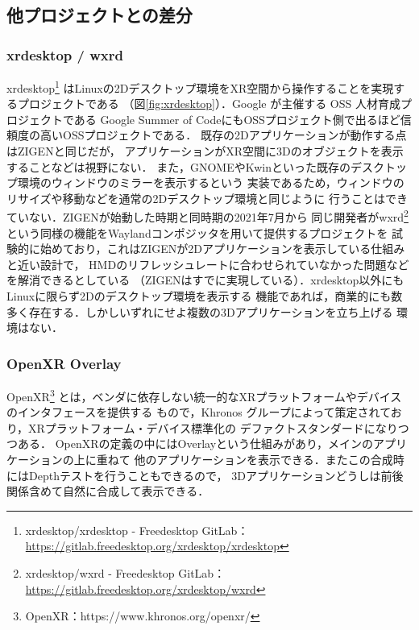 \subsection{他プロジェクトとの差分}
\label{section:project-uniqueness}

\subsubsection{xrdesktop / wxrd}

xrdesktop\footnote{xrdesktop/xrdesktop - Freedesktop GitLab：\url{https://gitlab.freedesktop.org/xrdesktop/xrdesktop}}
はLinuxの2Dデスクトップ環境をXR空間から操作することを実現するプロジェクトである
（図\ref{fig:xrdesktop}）．Google が主催する OSS 人材育成プロジェクトである
Google Summer of CodeにもOSSプロジェクト側で出るほど信頼度の高いOSSプロジェクトである．
既存の2Dアプリケーションが動作する点はZIGENと同じだが，
アプリケーションがXR空間に3Dのオブジェクトを表示することなどは視野にない．
また，GNOMEやKwinといった既存のデスクトップ環境のウィンドウのミラーを表示するという
実装であるため，ウィンドウのリサイズや移動などを通常の2Dデスクトップ環境と同じように
行うことはできていない．ZIGENが始動した時期と同時期の2021年7月から
同じ開発者がwxrd\footnote{xrdesktop/wxrd - Freedesktop GitLab：\url{https://gitlab.freedesktop.org/xrdesktop/wxrd}}
という同様の機能をWaylandコンポジッタを用いて提供するプロジェクトを
試験的に始めており，これはZIGENが2Dアプリケーションを表示している仕組みと近い設計で，
HMDのリフレッシュレートに合わせられていなかった問題などを解消できるとしている
（ZIGENはすでに実現している）．xrdesktop以外にもLinuxに限らず2Dのデスクトップ環境を表示する
機能であれば，商業的にも数多く存在する．しかしいずれにせよ複数の3Dアプリケーションを立ち上げる
環境はない．

\subsubsection{OpenXR Overlay}
\label{section:openxr-overlay}

OpenXR\footnote{OpenXR：https://www.khronos.org/openxr/}
とは，ベンダに依存しない統一的なXRプラットフォームやデバイスのインタフェースを提供する
もので，Khronos グループによって策定されており，XRプラットフォーム・デバイス標準化の
デファクトスタンダードになりつつある．
OpenXRの定義の中にはOverlayという仕組みがあり，メインのアプリケーションの上に重ねて
他のアプリケーションを表示できる．またこの合成時にはDepthテストを行うこともできるので，
3Dアプリケーションどうしは前後関係含めて自然に合成して表示できる．

